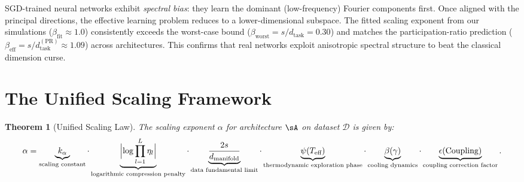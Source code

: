 \documentclass[11pt, a4paper]{article}
\newtheorem{theo}{Theorem}[section]
\theoremstyle{plain}
\def\sD{{\mathcal D}}
\begin{document}
\begin{rema}
SGD-trained neural networks exhibit \emph{spectral bias}: they learn the dominant (low-frequency) Fourier components first. Once aligned with the principal directions, the effective learning problem reduces to a lower-dimensional subspace. The fitted scaling exponent from our simulations ($\beta_{\mathrm{fit}} \approx 1.0$) consistently exceeds the worst-case bound ($\beta_{\mathrm{worst}} = s/d_{\mathrm{task}} = 0.30$) and matches the participation-ratio prediction ($\beta_{\mathrm{eff}} = s/d_{\mathrm{task}}^{\mathrm{(PR)}} \approx 1.09$) across architectures. This confirms that real networks exploit anisotropic spectral structure to beat the classical dimension curse.
\end{rema}

\section{The Unified Scaling Framework}

\begin{theo}[Unified Scaling Law]\label{theo:unified_scaling}
The scaling exponent $\alpha$ for architecture $\sA$ on dataset $\sD$ is given by:
\begin{equation}
\alpha = \underbrace{k_\alpha}_{\text{scaling constant}} \cdot \underbrace{\Bigl|\log\prod_{l=1}^{L} \eta_l\Bigr|}_{\text{logarithmic compression penalty}} \cdot \underbrace{\frac{2s}{d_{\text{manifold}}}}_{\text{data fundamental limit}} \cdot \underbrace{\psi(T_{\text{eff}})}_{\text{thermodynamic exploration phase}} \cdot \underbrace{\beta(\gamma)}_{\text{cooling dynamics}} \cdot \underbrace{\epsilon(\text{Coupling})}_{\text{coupling correction factor}}.
\label{eq:unified_scaling}
\end{equation}
\end{theo}
\end{document}
